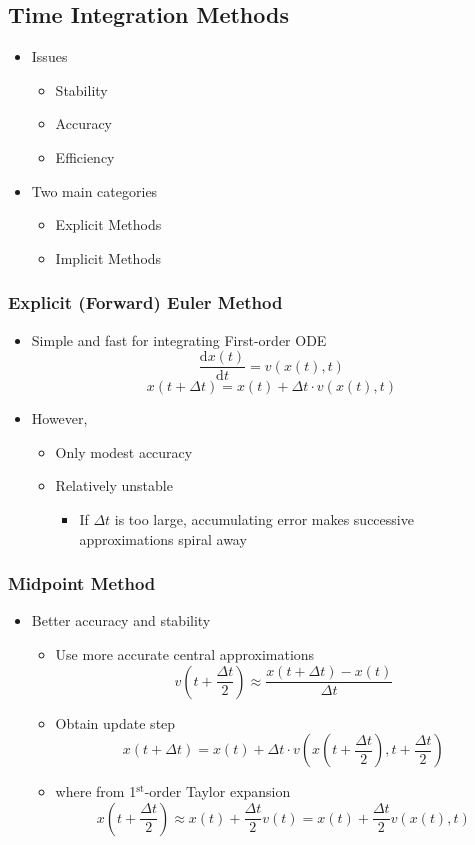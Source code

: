 \documentclass{article}
\newcommand{\der}{\text{d}}
\begin{document}
\subsection*{Time Integration Methods}
\begin{itemize}
    \item Issues
    \begin{itemize}
        \item Stability
        \item Accuracy 
        \item Efficiency
    \end{itemize}
    \item Two main categories
    \begin{itemize}
        \item Explicit Methods
        \item Implicit Methods
    \end{itemize}
\end{itemize}

\subsubsection*{Explicit (Forward) Euler Method}
\begin{itemize}
    \item Simple and fast for integrating First-order ODE
    \[\frac{\der x(t)}{\der t} = v(x(t), t)\]
    \[x(t + \Delta t) = x(t) + \Delta t \cdot v(x(t), t)\]
    \item However,
    \begin{itemize}
        \item Only modest accuracy
        \item Relatively unstable
        \begin{itemize}
            \item If $\Delta t$ is too large, accumulating error makes successive approximations spiral away
        \end{itemize}
    \end{itemize}
\end{itemize}

\subsubsection*{Midpoint Method}
\begin{itemize}
    \item Better accuracy and stability
    \begin{itemize}
        \item Use more accurate central approximations
        \[v\left(t +\frac{\Delta t}{2}\right)\approx \frac{x(t + \Delta t) - x(t)}{\Delta t}\]
        \item Obtain update step
        \[x(t + \Delta t) = x(t) + \Delta t \cdot v \left(x\left(t + \frac{\Delta t}{2}\right), t + \frac{\Delta t}{2}\right)\]
        \item where from 1$^{\text{st}}$-order Taylor expansion
        \[x\left(t + \frac{\Delta t}{2}\right) \approx x(t) + \frac{\Delta t}{2} v(t) = x(t) + \frac{\Delta t}{2} v(x(t), t)\]
    \end{itemize}
\end{itemize}
\end{document}
